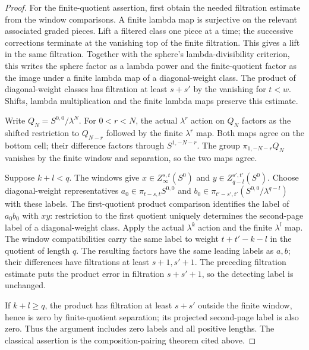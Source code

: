 \begin{proof}
For the finite-quotient assertion, first obtain the needed filtration
estimate from the window comparisons. A finite lambda map is surjective
on the relevant associated graded pieces. Lift a filtered class one
piece at a time; the successive corrections terminate at the vanishing
top of the finite filtration. This gives a lift in the same filtration.
Together with the sphere's lambda-divisibility criterion, this writes
the sphere factor as a lambda power and the finite-quotient factor
as the image under a finite lambda map of a diagonal-weight class. The
product of diagonal-weight classes has filtration at least $s+s'$ by
the vanishing for $t<w$. Shifts, lambda multiplication and the
finite lambda maps preserve this estimate.

Write $Q_N=S^{0,0}/\lambda^N$. For $0<r<N$, the actual
$\lambda^r$ action on $Q_N$ factors as the shifted restriction to
$Q_{N-r}$ followed by the finite $\lambda^r$ map. Both maps agree on
the bottom cell; their difference factors through $S^{1,-N-r}$.
The group $\pi_{1,-N-r}Q_N$ vanishes by the finite window and
separation, so the two maps agree.

Suppose $k+l<q$. The windows give
$x\in Z_\infty^{s,t}(S^0)$ and
$y\in Z_{q-l}^{s',t'}(S^0)$. Choose diagonal-weight representatives
$a_0\in\pi_{t-s,t}S^{0,0}$ and
$b_0\in\pi_{t'-s',t'}(S^{0,0}/\lambda^{q-l})$ with these labels.
The first-quotient product comparison identifies the label of
$a_0b_0$ with $xy$: restriction to the first quotient uniquely determines
the second-page label of a diagonal-weight class. Apply the actual $\lambda^k$ action
and the finite $\lambda^l$ map. The window compatibilities carry the
same label to weight $t+t'-k-l$ in the quotient of length $q$.
The resulting factors have the same leading labels as $a,b$; their
differences have filtrations at least $s+1,s'+1$. The preceding
filtration estimate puts the product error in filtration
$s+s'+1$, so the detecting label is unchanged.

If $k+l\ge q$, the product has filtration at least $s+s'$ outside
the finite window, hence is zero by finite-quotient separation; its
projected second-page label is also zero. Thus the argument includes
zero labels and all positive lengths. The classical assertion is the
composition-pairing theorem cited above.
\end{proof}

